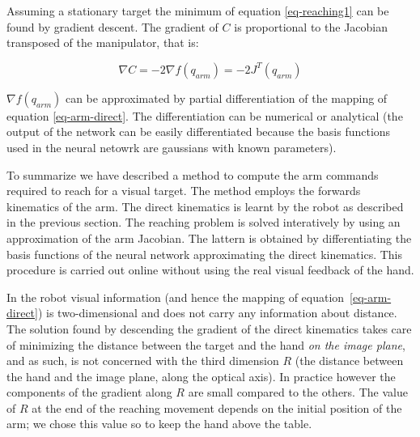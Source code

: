 Assuming a stationary target the minimum of equation \ref{eq-reaching1} 
can be found by gradient descent. The gradient of $C$ is proportional 
to the Jacobian transposed of the manipulator, that is:

\begin{equation}
  \nabla C=-2\nabla f\left(q_{arm}\right)=-2J^T\left(q_{arm}\right)
\label{eq-gradient}
\end{equation}

$\nabla f\left(q_{arm}\right)$ can be approximated by partial 
 differentiation of the mapping of equation \ref{eq-arm-direct}. The 
differentiation can be numerical or analytical (the output of the 
network can be easily differentiated because the basis functions used 
in the neural netowrk are gaussians with known parameters).

To summarize we have described a method to compute the arm commands
required to reach for a visual target. The method employs the 
forwards kinematics of the arm. The direct kinematics is learnt by the 
robot as described in the previous section. The reaching 
problem is solved interatively by using an approximation of the arm
Jacobian. The lattern is obtained by differentiating the basis functions 
of the neural network approximating the direct kinematics. This procedure
is carried out online without using the real visual feedback of the hand.

In the robot visual information (and hence the mapping of equation~\ref{eq-arm-direct}) 
is two-dimensional and does not carry any information
about distance. The solution found by descending the gradient of the 
direct kinematics takes care of minimizing the distance between the target 
and the hand \emph{on the image plane}, and as such, is not concerned 
with the third dimension $R$ (the distance between the hand and the image 
plane, along the optical axis). 
In practice however the components of the gradient along $R$ are small 
compared to the others. The value of $R$ at the end of the reaching movement 
depends on the initial position of the arm; we chose this value so to keep 
the hand above the table.

